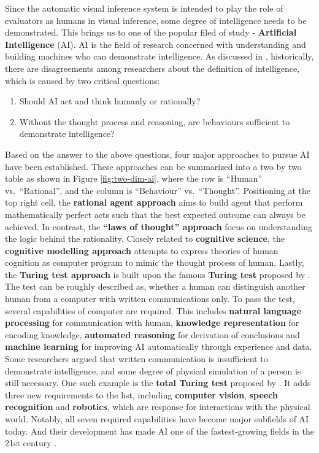 \documentclass{monashthesis}
\theoremstyle{definition}
\theoremstyle{definition}
\theoremstyle{definition}
\theoremstyle{definition}
\theoremstyle{remark}
\begin{document}
Since the automatic visual inference system is intended to play the role of evaluators as humans in visual inference, some degree of intelligence needs to be demonstrated. This brings us to one of the popular filed of study - \textbf{Artificial Intelligence} (AI). AI is the field of research concerned with understanding and building machines who can demonstrate intelligence. As discussed in \textcite{russell_artificial_2002}, historically, there are disagreements among researchers about the definition of intelligence, which is caused by two critical questions:

\begin{enumerate}
\def\labelenumi{\arabic{enumi}.}
\tightlist
\item
  Should AI act and think humanly or rationally?
\item
  Without the thought process and reasoning, are behaviours sufficient to demonstrate intelligence?
\end{enumerate}

Based on the answer to the above questions, four major approaches to pursue AI have been established. These approaches can be summarized into a two by two table as shown in Figure \ref{fig:two-dim-ai}, where the row is ``Human'' vs.~``Rational'', and the column is ``Behaviour'' vs.~``Thought''. Positioning at the top right cell, the \textbf{rational agent approach} aims to build agent that perform mathematically perfect acts such that the best expected outcome can always be achieved. In contrast, the \textbf{``laws of thought'' approach} focus on understanding the logic behind the rationality. Closely related to \textbf{cognitive science}, the \textbf{cognitive modelling approach} attempts to express theories of human cognition as computer program to mimic the thought process of human. Lastly, the \textbf{Turing test approach} is built upon the famous \textbf{Turing test} proposed by \textcite{turing_computing_1950}. The test can be roughly described as, whether a human can distinguish another human from a computer with written communications only. To pass the test, several capabilities of computer are required. This includes \textbf{natural language processing} for communication with human, \textbf{knowledge representation} for encoding knowledge, \textbf{automated reasoning} for derivation of conclusions and \textbf{machine learning} for improving AI automatically through experience and data. Some researchers argued that written communication is insufficient to demonstrate intelligence, and some degree of physical simulation of a person is still necessary. One such example is the \textbf{total Turing test} proposed by \textcite{harnad_other_1991}. It adds three new requirements to the list, including \textbf{computer vision}, \textbf{speech recognition} and \textbf{robotics}, which are response for interactions with the physical world. Notably, all seven required capabilities have become major subfields of AI today. And their development has made AI one of the fastest-growing fields in the 21st century \autocite{russell_artificial_2002}.
\end{document}
